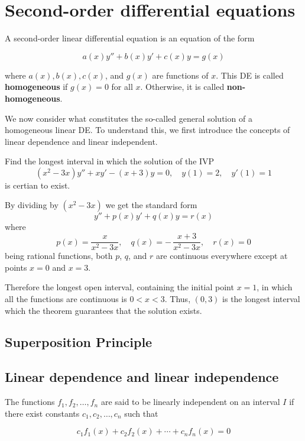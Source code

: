 \chapter{Second-order differential equations}
A second-order linear differential equation is an equation of the form

\begin{equation}
    a(x)y'' + b(x)y' + c(x)y = g(x)
\end{equation}

where $a(x), b(x), c(x)$, and $g(x)$ are functions of $x$. This DE is called \textbf{homogeneous} if 
$g(x) = 0$ for all $x$. Otherwise, it is called \textbf{non-homogeneous}.


We now consider what constitutes the so-called general solution of a homogeneous linear DE. To understand this, 
we first introduce the concepts of linear dependence and linear independent.

\begin{example}
    Find the longest interval in which the solution of the IVP 
    \[
        (x^2 - 3x)y'' + xy' - (x+3)y = 0, \quad y(1) = 2, \quad y'(1) = 1
    \]
    is certian to exist.
\end{example}
\begin{solution}
    By dividing by $(x^2 - 3x)$ we get the standard form 
    \[
        y'' + p(x)y' + q(x)y = r(x)
    \]
    where 
    \[
        p(x) = \frac{x}{x^2 - 3x}, \quad q(x) = -\, \frac{x+3}{x^2 - 3x}, \quad r(x) = 0
    \]
    being rational functions, both $p$, $q$, and $r$ are continuous everywhere except 
    at points $x = 0$ and $x = 3$. 

    Therefore the longest open interval, containing the initial point $x = 1$, in which all 
    the functions are continuous is $0 < x < 3$. Thus, $(0, 3)$ is the longest interval 
    which the theorem guarantees that the solution exists.
\end{solution}


\section{Superposition Principle}


\section{Linear dependence and linear independence}

\begin{definition}
    The functions $f_1, f_2, \ldots, f_n$ are said to be linearly independent on an interval $I$ if there 
    exist constants $c_1, c_2, \ldots, c_n$ such that 

    \begin{equation}
        c_1 f_1(x) + c_2 f_2(x) + \cdots + c_n f_n(x) = 0
    \end{equation}
\end{definition}

